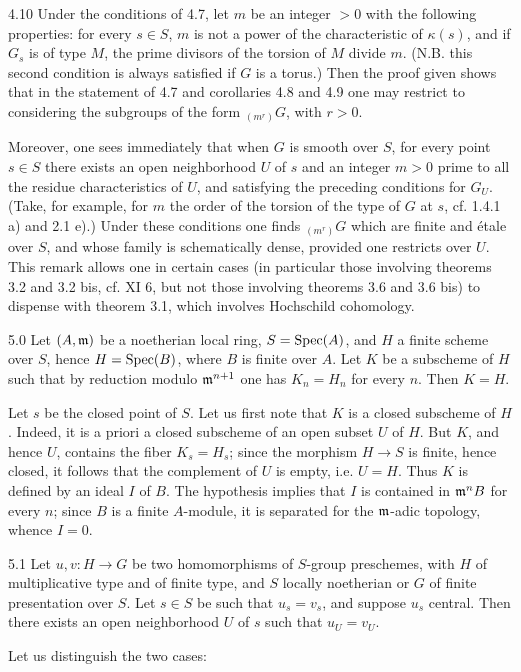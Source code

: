 \begin{remark}{4.10}\label{IX.4.10}
Under the conditions of 4.7, let $m$ be an integer $>0$ with the following properties: for every $s\in S$, $m$ is not a power of the characteristic of $\kappa(s)$, and if $G_s$ is of type $M$, the prime divisors of the torsion of $M$ divide $m$. (N.B. this second condition is always satisfied if $G$ is a torus.) Then the proof given shows that in the statement of 4.7 and corollaries 4.8 and 4.9 one may restrict to considering the subgroups of the form ${}_{(m^r)}G$, with $r>0$.

Moreover, one sees immediately that when $G$ is smooth over $S$, for every point $s\in S$ there exists an open neighborhood $U$ of $s$ and an integer $m>0$ prime to all the residue characteristics of $U$, and satisfying the preceding conditions for $G_U$. (Take, for example, for $m$ the order of the torsion of the type of $G$ at $s$, cf. 1.4.1 a) and 2.1 e).) Under these conditions one finds ${}_{(m^r)}G$ which are finite and étale over $S$, and whose family is schematically dense, provided one restricts over $U$. This remark allows one in certain cases (in particular those involving theorems 3.2 and 3.2 bis, cf. XI 6, but not those involving theorems 3.6 and 3.6 bis) to dispense with theorem 3.1, which involves Hochschild cohomology.
\end{remark}

\begin{lemma}{5.0}\label{IX.5.0}
 Let $(A,\mathfrak m)$ be a noetherian local ring, $S=\operatorname{Spec}(A)$, and $H$ a finite scheme over $S$, hence $H=\operatorname{Spec}(B)$, where $B$ is finite over $A$. Let $K$ be a subscheme of $H$ such that by reduction modulo $\mathfrak m^{n+1}$ one has $K_n=H_n$ for every $n$. Then $K=H$.
\end{lemma}
Let $s$ be the closed point of $S$. Let us first note that $K$ is a closed subscheme of $H$. Indeed, it is a priori a closed subscheme of an open subset $U$ of $H$. But $K$, and hence $U$, contains the fiber $K_s=H_s$; since the morphism $H\to S$ is finite, hence closed, it follows that the complement of $U$ is empty, i.e. $U=H$. Thus $K$ is defined by an ideal $I$ of $B$. The hypothesis implies that $I$ is contained in $\mathfrak m^nB$ for every $n$; since $B$ is a finite $A$-module, it is separated for the $\mathfrak m$-adic topology, whence $I=0$.
\begin{theorem}{5.1}\label{IX.5.1}
Let $u,v:H\to G$ be two homomorphisms of $S$-group preschemes, with $H$ of multiplicative type and of finite type, and $S$ locally noetherian or $G$ of finite presentation over $S$. Let $s\in S$ be such that $u_s=v_s$, and suppose $u_s$ central. Then there exists an open neighborhood $U$ of $s$ such that $u_U=v_U$.
\end{theorem}
Let us distinguish the two cases:


